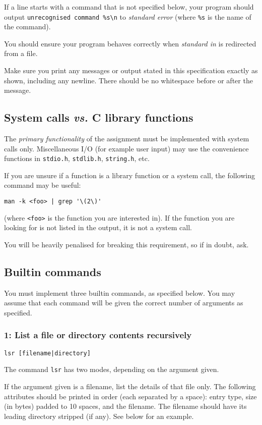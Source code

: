\documentclass[12pt,a4paper]{article}
\begin{document}
If a line starts with a command that is not specified below, your program
should output \verb|unrecognised command %s\n| to \textit{standard error}
(where \verb|%s| is the name of the command).

You should ensure your program behaves correctly when \textit{standard in} is
redirected from a file.

Make sure you print any messages or output stated in this specification exactly
as shown, including any newline. There should be no whitespace before or after
the message.

\subsection*{System calls \textit{vs.} C library functions}

The \textit{primary functionality} of the assignment must be implemented with
system calls only. Miscellaneous I\slash O (for example user input) may use the
convenience functions in \texttt{stdio.h}, \texttt{stdlib.h},
\texttt{string.h}, etc.

If you are unsure if a function is a library function or a system call, the
following command may be useful:

\verb:man -k <foo> | grep '\(2\)':

(where \texttt{<foo>} is the function you are interested in). If the function
you are looking for is not listed in the output, it is not a system call.

You will be heavily penalised for breaking this requirement, so if in doubt,
ask.

\subsection*{Builtin commands}

You must implement three builtin commands, as specified below. You may assume
that each command will be given the correct number of arguments as specified.

\subsubsection*{1: List a file or directory contents recursively}

\texttt{lsr [filename|directory]}

The command \texttt{lsr} has two modes, depending on the argument given.

If the argument given is a filename, list the details of that file only. The
following attributes should be printed in order (each separated by a space):
entry type, size (in bytes) padded to 10 spaces, and the filename. The filename
should have its leading directory stripped (if any). See below for an example.
\end{document}
